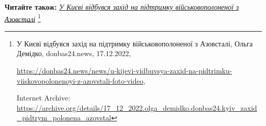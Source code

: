  
 
 
 
 

\textbf{Читайте також:} \href{https://archive.org/details/17_12_2022.olga_demidko.donbas24.kyiv_zaxid_pidtrym_polonena_azovstal}{\emph{У Києві відбувся захід на підтримку військовополоненої з Азовсталі}}%
\footnote{У Києві відбувся захід на підтримку військовополоненої з Азовсталі, Ольга Демідко, donbas24.news, 17.12.2022, \par%
\url{https://donbas24.news/news/u-kijevi-vidbuvsya-zaxid-na-pidtrimku-viiskovopolonenoyi-z-azovstali-foto-video}, \par%
Internet Archive: \url{https://archive.org/details/17_12_2022.olga_demidko.donbas24.kyiv_zaxid_pidtrym_polonena_azovstal}%
}

